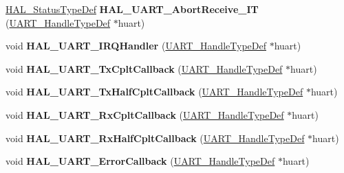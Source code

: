 \begin{DoxyCompactItemize}
\hyperlink{stm32f0xx__hal__def_8h_a63c0679d1cb8b8c684fbb0632743478f}{H\+A\+L\+\_\+\+Status\+Type\+Def} {\bfseries H\+A\+L\+\_\+\+U\+A\+R\+T\+\_\+\+Abort\+Receive\+\_\+\+IT} (\hyperlink{struct_u_a_r_t___handle_type_def}{U\+A\+R\+T\+\_\+\+Handle\+Type\+Def} $\ast$huart)
\item 
\mbox{\label{group___u_a_r_t___exported___functions___group2_gaad01472c507ceee3c5f2274c775ff3bf}} 
void {\bfseries H\+A\+L\+\_\+\+U\+A\+R\+T\+\_\+\+I\+R\+Q\+Handler} (\hyperlink{struct_u_a_r_t___handle_type_def}{U\+A\+R\+T\+\_\+\+Handle\+Type\+Def} $\ast$huart)
\item 
\mbox{\label{group___u_a_r_t___exported___functions___group2_gabcdf9b59049eccbc87d54042f9235b1a}} 
void {\bfseries H\+A\+L\+\_\+\+U\+A\+R\+T\+\_\+\+Tx\+Cplt\+Callback} (\hyperlink{struct_u_a_r_t___handle_type_def}{U\+A\+R\+T\+\_\+\+Handle\+Type\+Def} $\ast$huart)
\item 
\mbox{\label{group___u_a_r_t___exported___functions___group2_ga49b287e7de94cd0a38d333629298f7c4}} 
void {\bfseries H\+A\+L\+\_\+\+U\+A\+R\+T\+\_\+\+Tx\+Half\+Cplt\+Callback} (\hyperlink{struct_u_a_r_t___handle_type_def}{U\+A\+R\+T\+\_\+\+Handle\+Type\+Def} $\ast$huart)
\item 
\mbox{\label{group___u_a_r_t___exported___functions___group2_gae494a9643f29b87d6d81e5264e60e57b}} 
void {\bfseries H\+A\+L\+\_\+\+U\+A\+R\+T\+\_\+\+Rx\+Cplt\+Callback} (\hyperlink{struct_u_a_r_t___handle_type_def}{U\+A\+R\+T\+\_\+\+Handle\+Type\+Def} $\ast$huart)
\item 
\mbox{\label{group___u_a_r_t___exported___functions___group2_ga1884970cc493d8efba5aec28c0d526e7}} 
void {\bfseries H\+A\+L\+\_\+\+U\+A\+R\+T\+\_\+\+Rx\+Half\+Cplt\+Callback} (\hyperlink{struct_u_a_r_t___handle_type_def}{U\+A\+R\+T\+\_\+\+Handle\+Type\+Def} $\ast$huart)
\item 
\mbox{\label{group___u_a_r_t___exported___functions___group2_ga0e0456ea96d55db31de947fb3e954f18}} 
void {\bfseries H\+A\+L\+\_\+\+U\+A\+R\+T\+\_\+\+Error\+Callback} (\hyperlink{struct_u_a_r_t___handle_type_def}{U\+A\+R\+T\+\_\+\+Handle\+Type\+Def} $\ast$huart)

\end{DoxyCompactItemize}
